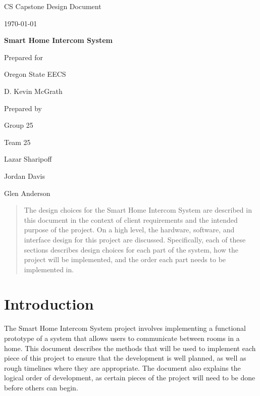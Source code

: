 \documentclass[onecolumn, draftclsnofoot,10pt, compsoc]{IEEEtran}
\def \CapstoneTeamName{        Team 25}
\def \CapstoneTeamNumber{        25}
\def \GroupMemberOne{            Lazar Sharipoff}
\def \GroupMemberTwo{            Jordan Davis}
\def \GroupMemberThree{            Glen Anderson}
\def \CapstoneProjectName{        Smart Home Intercom System}
\def \CapstoneSponsorCompany{    Oregon State EECS}
\def \CapstoneSponsorPerson{        D. Kevin McGrath}
\def \DocType{        %
                Design Document
                }
\newcommand{\NameSigPair}[1]{\par
\makebox[2.75in][r]{#1} \hfil     \makebox[3.25in]{\makebox[2.25in]{\hrulefill} \hfill        \makebox[.75in]{\hrulefill}}
\par\vspace{-12pt} \textit{\tiny\noindent
\makebox[2.75in]{} \hfil        \makebox[3.25in]{\makebox[2.25in][r]{Signature} \hfill    \makebox[.75in][r]{Date}}}}
\renewcommand{\NameSigPair}[1]{#1}
\begin{document}
\begin{titlepage}
\begin{singlespace}
\hfill
\par\vspace{.2in}
\centering
\scshape{
\huge CS Capstone \DocType \par
{\large\today}\par
\vspace{.5in}
\textbf{\Huge\CapstoneProjectName}\par
\vfill
{\large Prepared for}\par
\Huge \CapstoneSponsorCompany\par
\vspace{5pt}
{\Large\NameSigPair{\CapstoneSponsorPerson}\par}
{\large Prepared by }\par
Group\CapstoneTeamNumber\par
\CapstoneTeamName\par
\vspace{5pt}
{\Large
\NameSigPair{\GroupMemberOne}\par
\NameSigPair{\GroupMemberTwo}\par
\NameSigPair{\GroupMemberThree}\par
}
\vspace{20pt}
}
\begin{abstract}
The design choices for the Smart Home Intercom System are described in this document in the context of client requirements and the intended purpose of the project. On a high level, the hardware, software, and interface design for this project are discussed. Specifically, each of these sections describes design choices for each part of the system, how the project will be implemented, and the order each part needs to be implemented in. 
\end{abstract}
\end{singlespace}
\end{titlepage}
\newpage
{}
\tableofcontents
\clearpage


\section{Introduction}
The Smart Home Intercom System project involves implementing a functional prototype of a system that allows users to communicate between rooms in a home. This document describes the methods that will be used to implement each piece of this project to ensure that the development is well planned, as well as rough timelines where they are appropriate. The document also explains the logical order of development, as certain pieces of the project will need to be done before others can begin.
\end{document}
